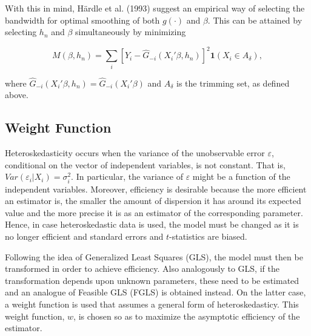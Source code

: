 \documentclass[a4paper]{article}
\begin{document}
With this in mind, H{\"a}rdle et al. (1993) suggest an empirical way of selecting the bandwidth for optimal smoothing of both $g(\cdot)$ and $\beta$. This can be attained by selecting $h_n$ and $\beta$ simultaneously by minimizing

\begin{equation}
M(\beta, h_n) = \sum_i \left[ Y_i - \hat{G}_{-i}(X_i'\beta, h_n) \right]^2\mathbf{1}{(X_i \in A_\delta)},
\end{equation}

where $\hat{G}_{-i}(X_i'\beta, h_n) = \hat{G}_{-i}(X_i'\beta)$ and $A_\delta$ is the trimming set, as defined above.	

\subsection{Weight Function} %
\label{sub:Weight Function}

Heteroskedasticity occurs when the variance of the unobservable error $\varepsilon$, conditional on  the vector of independent variables, is not constant. That is, $Var(\varepsilon_i|X_i) = \sigma_i^2$. In particular, the variance of $\varepsilon$ might be a function of the independent variables.
Moreover, efficiency is desirable because the more efficient an estimator is, the smaller the amount of dispersion it has around its expected value and the more precise it is as an estimator of the corresponding parameter. 
Hence, in case heteroskedastic data is used, the model must be changed as it is no longer efficient and standard errors and $t$-statistics are biased.

Following the idea of Generalized Least Squares (GLS), the model must then be transformed in order to achieve efficiency. Also analogously to GLS, if the transformation depends upon unknown parameters, these need to be estimated and an analogue of Feasible GLS (FGLS) is obtained instead. On the latter case, a weight function is used that assumes a general form of heteroskedasticy. This weight function, $w$, is chosen so as to maximize the asymptotic efficiency of the estimator. 

\end{document}
